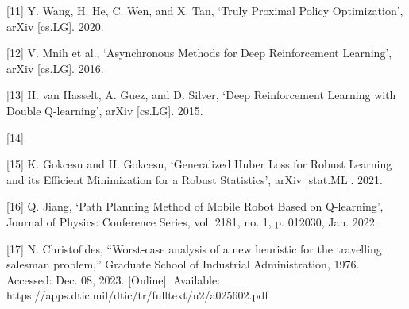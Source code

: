 \documentclass{article}
\begin{document}
	[11] Y. Wang, H. He, C. Wen, and X. Tan, ‘Truly Proximal Policy Optimization’, arXiv [cs.LG]. 2020.
	
	[12] V. Mnih et al., ‘Asynchronous Methods for Deep Reinforcement Learning’, arXiv [cs.LG]. 2016.
	
	[13] H. van Hasselt, A. Guez, and D. Silver, ‘Deep Reinforcement Learning with Double Q-learning’, arXiv [cs.LG]. 2015.
	
	[14] 
	
	[15] K. Gokcesu and H. Gokcesu, ‘Generalized Huber Loss for Robust Learning and its Efficient Minimization for a Robust Statistics’, arXiv [stat.ML]. 2021.
	
	[16] Q. Jiang, ‘Path Planning Method of Mobile Robot Based on Q-learning’, Journal of Physics: Conference Series, vol. 2181, no. 1, p. 012030, Jan. 2022.
	
	[17] N. Christofides, “Worst-case analysis of a new heuristic for the travelling salesman problem,” Graduate School of Industrial Administration, 1976. Accessed: Dec. 08, 2023. [Online]. Available: https://apps.dtic.mil/dtic/tr/fulltext/u2/a025602.pdf
	
\end{document}
